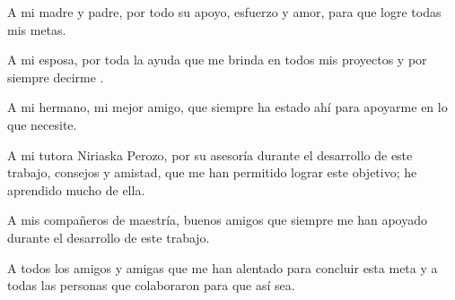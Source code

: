 %
%
%


A mi madre y padre, por todo su apoyo, esfuerzo y amor, para que logre todas mis metas.

A mi esposa, por toda la ayuda que me brinda en todos mis proyectos y por siempre decirme .

A mi hermano, mi mejor amigo, que siempre ha estado ahí para apoyarme en lo que necesite.

A mi tutora Niriaska Perozo, por su asesoría durante el desarrollo de este trabajo, consejos y amistad, que me han permitido lograr este objetivo; he aprendido mucho de ella.

A mis compañeros de maestría, buenos amigos que siempre me han apoyado durante el desarrollo de este trabajo.

A todos los amigos y amigas que me han alentado para concluir esta meta y a todas las personas que colaboraron para que así sea.
